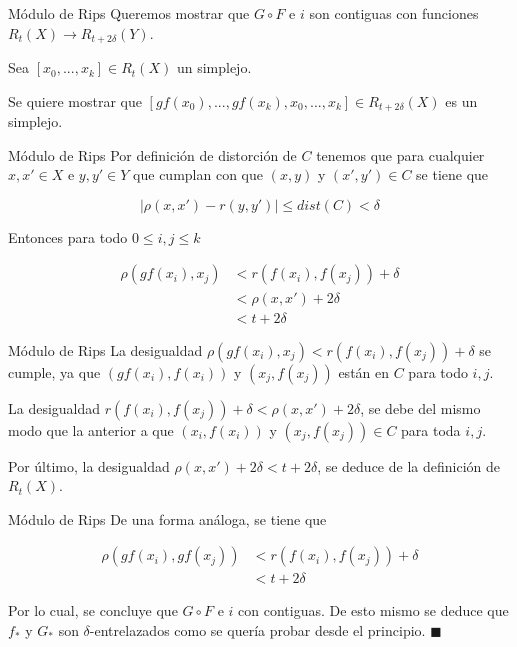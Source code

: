 \documentclass{beamer}
\begin{document}
\begin{frame}{Módulo de Rips}
    Queremos mostrar que $G\circ  F$ e $i$ son contiguas con funciones $R_{t}(X) \to R_{t + 2\delta}(Y)$.
    \newline
    \pause

    Sea $[x_{0},...,x_{k}]\in R_{t}(X)$ un simplejo. 
    \newline
    \pause
    
    Se quiere mostrar que $[gf(x_{0}), ..., gf(x_{k}), x_{0},..., x_{k}]\in R_{t+2\delta}(X)$ es un simplejo.
\end{frame}

\begin{frame}{Módulo de Rips}
    Por definición de distorción de $C$ tenemos que para cualquier $x,x' \in X$ e $y,y'\in Y$ que cumplan con que $(x,y)$ y $(x',y') \in C$ se tiene que 
    \pause

    $$|\rho(x, x') - r(y,y')| \leq dist(C) < \delta$$
    \pause
    
    Entonces para todo $0\leq i, j \leq k$
    \pause
    
    \begin{align*}
    \rho(gf(x_{i}), x_{j}) & < r(f(x_{i}), f(x_{j})) + \delta\\
    & < \rho(x, x') + 2\delta\\
    & < t + 2\delta
    \end{align*}
\end{frame}

\begin{frame}{Módulo de Rips}
    La desigualdad $\rho(gf(x_{i}), x_{j}) < r(f(x_{i}), f(x_{j})) + \delta$ se cumple, ya que $(gf(x_{i}), f(x_{i}))$ y $(x_{j}, f(x_{j}))$ están en $C$ para todo $i,j$.
    \newline
    \pause
    
    La desigualdad $r(f(x_{i}), f(x_{j})) + \delta < \rho(x, x') + 2\delta$, se debe del mismo modo que la anterior a que  $(x_{i}, f(x_{i}))$ y $(x_{j}, f(x_{j})) \in C$ para toda $i,j$.
    \newline
    \pause

    Por último, la desigualdad $\rho(x, x') + 2\delta < t + 2\delta$, se deduce de la definición de $R_{t}(X)$. 
\end{frame}

\begin{frame}{Módulo de Rips}
    De una forma análoga, se tiene que 
    \pause
    
    \begin{align*}
    \rho(gf(x_{i}), gf(x_{j})) & < r(f(x_{i}), f(x_{j})) + \delta\\
    & < t + 2\delta
    \end{align*}
    \pause

    Por lo cual, se concluye que $G\circ F$ e $i$ con contiguas. De esto mismo se deduce que $f_{*}$ y $G_{*}$ son $\delta$-entrelazados como se quería probar desde el principio.
    \hfill $\blacksquare$ \par \bigskip
\end{frame}
\end{document}
